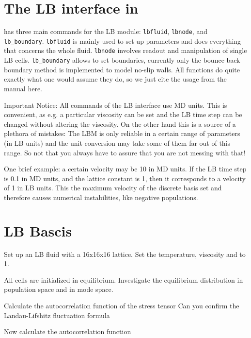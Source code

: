

\section{The LB interface in \ES{}}
\ES{} has three main commands for the LB module: 
 \lstinline|lbfluid|,  \lstinline|lbnode|, and  \lstinline|lb_boundary|.
 \lstinline|lbfluid| is mainly used to set up parameters and does everything that
concerns the whole fluid.  \lstinline|lbnode| involves readout and manipulation of
single LB cells.  \lstinline|lb_boundary| allows to set boundaries, currently only
the bounce back boundary method is implemented to model
no-slip walls. All functions do quite exactly what one would 
assume they do, so we just cite the usage from the \ES{} manual here.

Important Notice: All commands of the LB interface use
MD units. This is convenient, as e.g. a particular 
viscosity can be set and the LB time step can be changed without
altering the viscosity. On the other hand this is a source
of a plethora of mistakes: The LBM is only reliable in a certain 
range of parameters (in LB units) and the unit conversion
may take some of them far out of this range. So not that you always
have to assure that you are not messing with that!

One brief example: a certain velocity may be 10 in MD units.
If the LB time step is 0.1 in MD units, and the lattice constant
is 1, then it corresponds to a velocity of 1 in LB units. 
This the maximum velocity of the discrete basis set and therefore
causes numerical instabilities, like negative populations.

\section{LB Bascis}
Set up an LB fluid with a 16x16x16 lattice. 
Set the temperature, viscosity and to 1.

All cells are initialized in equilibrium. Investigate the
equilibrium distribution in population space and in mode space.

Calculate the autocorrelation function of the stress tensor
Can you confirm the Landau-Lifshitz fluctuation formula

Now calculate the autocorrelation function 
